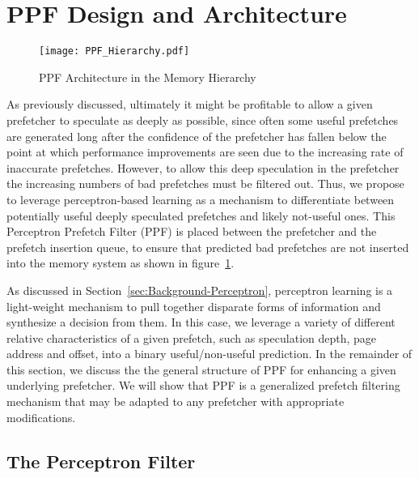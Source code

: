 \section{PPF Design and Architecture}
\label{Arch}

\begin{figure}
  \begin{center}
  \texttt{[image: PPF\_Hierarchy.pdf]}
    \label{fig:PPF_Hierarchy}
  \caption{PPF Architecture in the Memory Hierarchy}
  \end{center}
\end{figure}

As previously discussed, ultimately it might be profitable to allow a given
prefetcher to speculate as deeply as possible, since often some useful
prefetches are generated long after the confidence of the prefetcher has
fallen below the point at which performance improvements are seen due to the
increasing rate of inaccurate prefetches.  However, to allow this deep
speculation in the prefetcher the increasing numbers of bad prefetches must be
filtered out.  Thus, we propose to leverage perceptron-based learning as a
mechanism to differentiate between potentially useful deeply speculated
prefetches and likely not-useful ones.  This Perceptron Prefetch Filter (PPF)
is placed between the prefetcher and the prefetch insertion queue, to ensure
that predicted bad prefetches are not inserted into the memory system as shown in 
figure~\ref{fig:PPF_Hierarchy}.

As discussed in Section~\ref{sec:Background-Perceptron}, perceptron learning
is a light-weight mechanism to pull together disparate forms of information
and synthesize a decision from them.  In this case, we leverage a variety of
different relative characteristics of a given prefetch, such as speculation
depth, page address and offset, into a binary useful/non-useful prediction.
In the remainder of this section, we discuss the the general structure of PPF
for enhancing a given underlying prefetcher.  We will show that PPF is a
generalized prefetch filtering mechanism that may be adapted to any prefetcher
with appropriate modifications.

\subsection{The Perceptron Filter}
\label{Arch-Perceptron}


